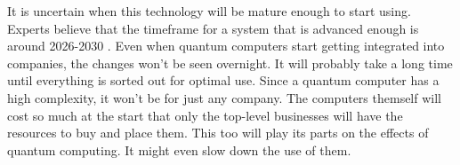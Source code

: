 It is uncertain when this technology will be mature enough to start using. Experts believe that the timeframe for a system that is advanced enough is around 2026-2030 \autocite{timeframe}.
Even when quantum computers start getting integrated into companies, the changes won't be seen overnight. It will probably take a long time until everything is sorted out for optimal use.
Since a quantum computer has a high complexity, it won't be for just any company. The computers themself will cost so much at the start that only the top-level businesses will have the resources to buy and place them.
This too will play its parts on the effects of quantum computing. It might even slow down the use of them.

